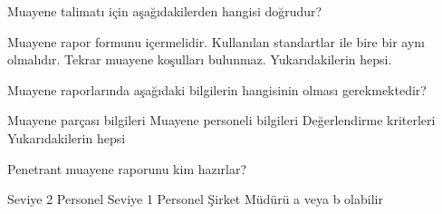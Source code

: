 \begin{question}[subtitle=]
Muayene talimatı için aşağıdakilerden hangisi doğrudur?
	\begin{tasks}
          \task Muayene rapor formunu içermelidir. \correct
          \task Kullanılan standartlar ile bire bir aynı olmalıdır.
          \task Tekrar muayene koşulları bulunmaz.
          \task Yukarıdakilerin hepsi.
	\end{tasks}
\end{question}
\begin{solution}
	\correct
\end{solution}

\begin{question}[subtitle=]
  Muayene raporlarında aşağıdaki bilgilerin hangisinin olması gerekmektedir?
	\begin{tasks}
          \task Muayene parçası bilgileri
          \task Muayene personeli bilgileri
          \task Değerlendirme kriterleri
          \task Yukarıdakilerin hepsi \correct
	\end{tasks}
\end{question}
\begin{solution}
	\correct
\end{solution}

\begin{question}[subtitle=]
  Penetrant muayene raporunu kim hazırlar?
	\begin{tasks}
          \task Seviye 2 Personel
          \task Seviye 1 Personel
          \task Şirket Müdürü
          \task a veya b olabilir \correct
	\end{tasks}
\end{question}
\begin{solution}
	\correct
\end{solution}
